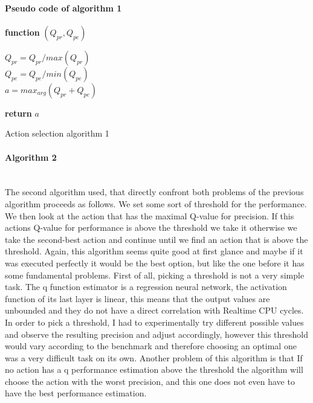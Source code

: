 \paragraph{Pseudo code of algorithm 1}
\begin{center}
\begin{algorithm}[H]

    \textbf{function}  $(Q_{pr},Q_{pe})$\;
    
    
    \Indp{}\Indm
    \Indp{} \Indm
    \Indp
    $Q_{pr} = Q_{pr}/max(Q_{pr})$\\
    $Q_{pe} = Q_{pe}/min(Q_{pe})$\\
    $a = max_{arg}(Q_{pr}+Q_{pe})$
    
  
   \textbf{return} $a$

\caption{Action selection algorithm 1}
\end{algorithm}
\end{center}
\paragraph{Algorithm 2}\mbox{}\\
The second algorithm used, that directly confront both problems of the previous algorithm proceeds as follows. We set some sort of threshold for the performance. We then look at the action that has the maximal Q-value for precision. If this actions Q-value for performance is above the threshold we take it otherwise we take the second-best action and continue until we find an action that is above the threshold. Again, this algorithm seems quite good at first glance and maybe if it was executed perfectly it would be the best option, but like the one before it has some fundamental problems. First of all, picking a threshold is not a very simple task. The q function estimator is a regression neural network, the activation function of its last layer is linear, this means that the output values are unbounded and they do not have a direct correlation with Realtime CPU cycles. In order to pick a threshold, I had to experimentally try different possible values and observe the resulting precision and adjust accordingly, however this threshold would vary according to the benchmark and therefore choosing an optimal one was a very difficult task on its own. Another problem of this algorithm is that If no action has a q performance estimation above the threshold the algorithm will choose the action with the worst precision, and this one does not even have to have the best performance estimation. 
